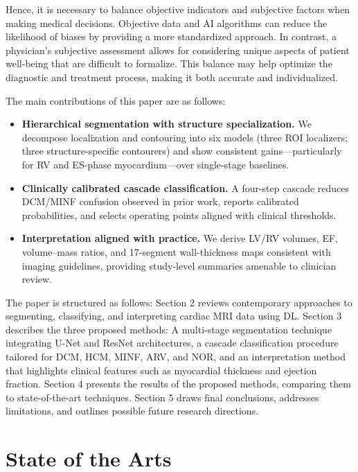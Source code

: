 \documentclass[fleqn,10pt]{wlscirep}
\begin{document}
Hence, it is necessary to balance objective indicators and subjective factors when making medical decisions. Objective data and AI algorithms can reduce the likelihood of biases by providing a more standardized approach. In contrast, a physician's subjective assessment allows for considering unique aspects of patient well-being that are difficult to formalize. This balance may help optimize the diagnostic and treatment process, making it both accurate and individualized.

The main contributions of this paper are as follows:
\begin{itemize}
    \item \textbf{Hierarchical segmentation with structure specialization.} We decompose localization and contouring into six models (three ROI localizers; three structure-specific contourers) and show consistent gains---particularly for RV and ES-phase myocardium---over single-stage baselines\cite{Ronneberger:2015,Hu:2023,daSilva:2024}.
    \item \textbf{Clinically calibrated cascade classification.} A four-step cascade reduces DCM/MINF confusion observed in prior work\cite{Isensee:2018,Khened:2019,Zheng:2019}, reports calibrated probabilities, and selects operating points aligned with clinical thresholds.
    \item \textbf{Interpretation aligned with practice.} We derive LV/RV volumes, EF, volume--mass ratios, and 17-segment wall-thickness maps consistent with imaging guidelines\cite{Szabo:2022,Watanabe:2022}, providing study-level summaries amenable to clinician review.
\end{itemize}

The paper is structured as follows: Section 2 reviews contemporary approaches to segmenting, classifying, and interpreting cardiac MRI data using DL. Section 3 describes the three proposed methods: A multi-stage segmentation technique integrating U-Net and ResNet architectures, a cascade classification procedure tailored for DCM, HCM, MINF, ARV, and NOR, and an interpretation method that highlights clinical features such as myocardial thickness and ejection fraction. Section 4 presents the results of the proposed methods, comparing them to state-of-the-art techniques. Section 5 draws final conclusions, addresses limitations, and outlines possible future research directions.

\section*{State of the Arts}
\end{document}

